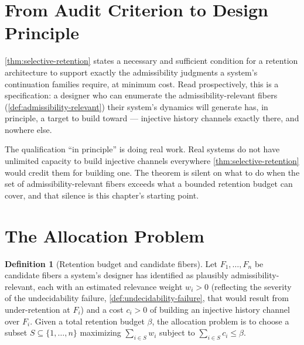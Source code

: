\documentclass[11pt]{book}
\theoremstyle{plain}
\theoremstyle{definition}
\newtheorem{definition}[theorem]{Definition}
\theoremstyle{remark}
\begin{document}
\section{From Audit Criterion to Design Principle}

\cref{thm:selective-retention} states a necessary and sufficient
condition for a retention architecture to support exactly the
admissibility judgments a system's continuation families require, at
minimum cost. Read prospectively, this is a specification: a designer
who can enumerate the admissibility-relevant fibers
(\cref{def:admissibility-relevant}) their system's dynamics will
generate has, in principle, a target to build toward --- injective
history channels exactly there, and nowhere else.

The qualification \enquote{in principle} is doing real work. Real
systems do not have unlimited capacity to build injective channels
everywhere \cref{thm:selective-retention} would credit them for
building one. The theorem is silent on what to do when the set of
admissibility-relevant fibers exceeds what a bounded retention budget
can cover, and that silence is this chapter's starting point.

\section{The Allocation Problem}

\begin{definition}[Retention budget and candidate fibers]
\label{def:allocation-problem}
Let $F_1, \dots, F_n$ be candidate fibers a system's designer has
identified as plausibly admissibility-relevant, each with an estimated
relevance weight $w_i > 0$ (reflecting the severity of the
undecidability failure, \cref{def:undecidability-failure}, that would
result from under-retention at $F_i$) and a cost $c_i > 0$ of building
an injective history channel over $F_i$. Given a total retention
budget $\beta$, the allocation problem is to choose a subset $S
\subseteq \{1, \dots, n\}$ maximizing $\sum_{i \in S} w_i$ subject to
$\sum_{i \in S} c_i \leq \beta$.
\end{definition}
\end{document}

